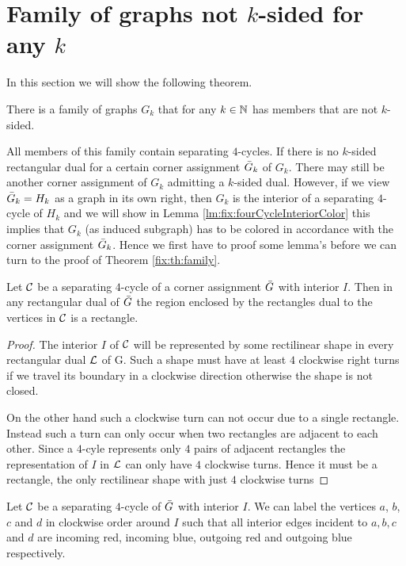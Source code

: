 
\section{Family of graphs not $k$-sided for any $k$}
\thispagestyle{plain}
  \label{s:fix}
  In this section we will show the following theorem.

  \begin{thrm}
    \label{fix:th:family}
      There is a family of graphs $G_k$ that for any $k \in \mathbb{N}$ has members that are not $k$-sided.
  \end{thrm}

  All members of this family contain separating $4$-cycles.
  If there is no $k$-sided rectangular dual for a certain corner assignment $\bar{G}_k$ of $G_k$. There may still be another corner assignment of $G_k$ admitting a $k$-sided dual.
  However, if we view $\bar{G}_k = H_k$ as a graph in its own right, then $G_k$ is the interior of a separating $4$-cycle of $H_k$ and we will show in Lemma \ref{lm:fix:fourCycleInteriorColor} this implies that $G_k$ (as induced subgraph) has to be colored in accordance with the corner assignment $\bar{G}_k$. Hence we first have to proof some lemma's before we can turn to the proof of Theorem \ref{fix:th:family}.

  \begin{lemma}
    \label{lm:interiorRectangle}
    Let $\mathcal{C}$ be a separating $4$-cycle of a corner assignment $\bar{G}$ with interior $I$. Then in any rectangular dual of $\bar{G}$ the region enclosed by the rectangles dual to the vertices in $\mathcal{C}$ is a rectangle.
  \end{lemma}
  \begin{proof}
    The interior $I$ of $\mathcal{C}$ will be represented by some rectilinear shape in every rectangular dual $\mathcal{L}$ of G. Such a shape must have at least $4$ clockwise right turns if we travel its boundary in a clockwise direction otherwise the shape is not closed.

    On the other hand such a clockwise turn can not occur due to a single rectangle. Instead such a turn can only occur when two rectangles are adjacent to each other. Since a $4$-cyle represents only $4$ pairs of adjacent rectangles the representation of $I$ in $\mathcal{L}$ can only have $4$ clockwise turns. Hence it must be a rectangle, the only rectilinear shape with just $4$ clockwise turns
  \end{proof}

  \begin{lemma}
  \label{lm:fix:fourCycleInteriorColor}
  Let $\mathcal{C}$ be a separating $4$-cycle of $\bar{G}$ with interior $I$. We can label the vertices $a$, $b$, $c$ and $d$ in clockwise order around $I$ such that all interior edges incident to $a, b, c$ and $d$ are incoming red, incoming blue, outgoing red and outgoing blue respectively.
  \end{lemma}

